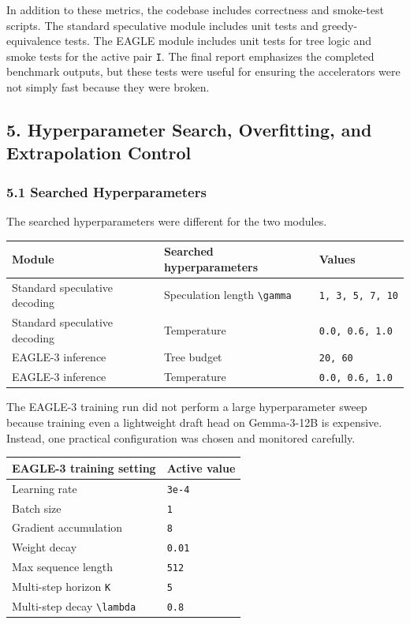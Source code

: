 \documentclass[
]{article}
\newcounter{none} %
\begin{document}
In addition to these metrics, the codebase includes correctness and
smoke-test scripts. The standard speculative module includes unit tests
and greedy-equivalence tests. The EAGLE module includes unit tests for
tree logic and smoke tests for the active pair \texttt{I}. The final
report emphasizes the completed benchmark outputs, but these tests were
useful for ensuring the accelerators were not simply fast because they
were broken.

\subsection{5. Hyperparameter Search, Overfitting, and Extrapolation
Control}\label{5-hyperparameter-search-overfitting-and-extrapolation-control}

\subsubsection{5.1 Searched
Hyperparameters}\label{51-searched-hyperparameters}

The searched hyperparameters were different for the two modules.

{\def\LTcaptype{none} %
\begin{longtable}[]{@{}lll@{}}
\toprule\noalign{}
Module & Searched hyperparameters & Values \\
\midrule\noalign{}
\endhead
\bottomrule\noalign{}
\endlastfoot
Standard speculative decoding & Speculation length
\texttt{\textbackslash{}gamma} & \texttt{1,\ 3,\ 5,\ 7,\ 10} \\
Standard speculative decoding & Temperature &
\texttt{0.0,\ 0.6,\ 1.0} \\
EAGLE-3 inference & Tree budget & \texttt{20,\ 60} \\
EAGLE-3 inference & Temperature & \texttt{0.0,\ 0.6,\ 1.0} \\
\end{longtable}
}

The EAGLE-3 training run did not perform a large hyperparameter sweep
because training even a lightweight draft head on Gemma-3-12B is
expensive. Instead, one practical configuration was chosen and monitored
carefully.

{\def\LTcaptype{none} %
\begin{longtable}[]{@{}ll@{}}
\toprule\noalign{}
EAGLE-3 training setting & Active value \\
\midrule\noalign{}
\endhead
\bottomrule\noalign{}
\endlastfoot
Learning rate & \texttt{3e-4} \\
Batch size & \texttt{1} \\
Gradient accumulation & \texttt{8} \\
Weight decay & \texttt{0.01} \\
Max sequence length & \texttt{512} \\
Multi-step horizon \texttt{K} & \texttt{5} \\
Multi-step decay \texttt{\textbackslash{}lambda} & \texttt{0.8} \\
\end{longtable}
}
\end{document}
